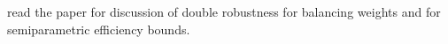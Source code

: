 read the paper \cite{Zhao2017a} for discussion of double robustness for balancing weights and \cite{Hahn1998} for semiparametric efficiency bounds.
